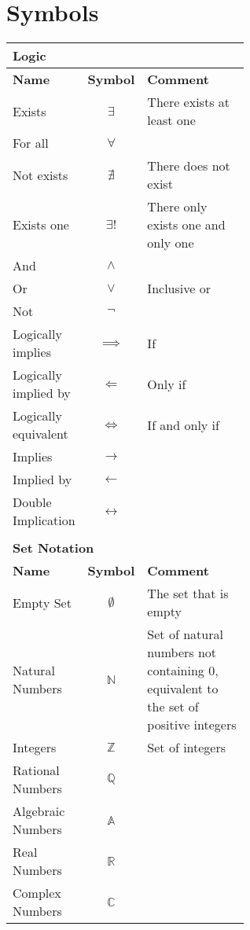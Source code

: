\documentclass[12pt, english]{book}
\begin{document}
	\section*{Symbols}
	\begin{tabularx}{\textwidth}{ l c p{0.6\linewidth}}
		\multicolumn{3}{l}{\textbf{{\large Logic}}} \\ [10pt]
		\hline
		\textbf{Name} & \textbf{Symbol} & \textbf{Comment} \\
		\hline
		Exists 					& $\exists$ 		& There exists at least one\\
		For all 				& $\forall$ 		& \\
		Not exists 				& $\nexists$ 		& There does not exist\\ 
		Exists one				& $\exists!$ 		& There only exists one and only one \\
		And 					& $\land$			& \\
		Or						& $\lor$			& Inclusive or \\
		Not 					& $\neg$			& \\
		Logically implies 		& $\implies$ 		& If \\
		Logically implied by 	& $\Longleftarrow$ 	& Only if \\  
		Logically equivalent 	& $\iff$ 			& If and only if \\
		Implies 				& $\longrightarrow$	& \\
		Implied by 				& $\longleftarrow$ 	& \\  
		Double Implication 		& $\longleftrightarrow$	& \\
		\hline	
		
		& & \\
		\multicolumn{3}{l}{\textbf{{\large Set Notation}}} \\ [10pt]
		\hline
		\textbf{Name} & \textbf{Symbol} & \textbf{Comment} \\
		\hline
 		Empty Set 				& $\emptyset$ 		& The set that is empty \\
 		Natural Numbers 		& $\mathbb{N}$		& Set of natural numbers not containing 0, equivalent to the set of positive integers \\
 		Integers 				& $\mathbb{Z}$		& Set of integers \\
 		Rational Numbers 		& $\mathbb{Q}$		& \\
 		Algebraic Numbers		& $\mathbb{A}$		& \\
 		Real Numbers 			& $\mathbb{R}$		& \\
 		Complex Numbers 		& $\mathbb{C}$		& \\
 		

\end{tabularx}
\end{document}
